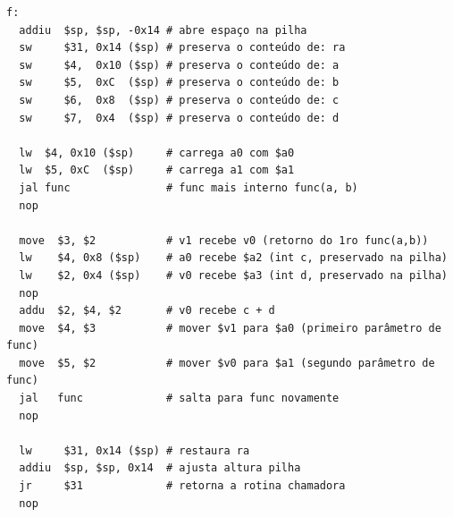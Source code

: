 \documentclass{article}
\begin{document}
\begin{verbatim}
f:
  addiu  $sp, $sp, -0x14 # abre espaço na pilha
  sw     $31, 0x14 ($sp) # preserva o conteúdo de: ra
  sw     $4,  0x10 ($sp) # preserva o conteúdo de: a
  sw     $5,  0xC  ($sp) # preserva o conteúdo de: b
  sw     $6,  0x8  ($sp) # preserva o conteúdo de: c
  sw     $7,  0x4  ($sp) # preserva o conteúdo de: d

  lw  $4, 0x10 ($sp)     # carrega a0 com $a0
  lw  $5, 0xC  ($sp)     # carrega a1 com $a1
  jal func               # func mais interno func(a, b)
  nop

  move  $3, $2           # v1 recebe v0 (retorno do 1ro func(a,b))
  lw    $4, 0x8 ($sp)    # a0 recebe $a2 (int c, preservado na pilha)
  lw    $2, 0x4 ($sp)    # v0 recebe $a3 (int d, preservado na pilha)
  nop
  addu  $2, $4, $2       # v0 recebe c + d
  move  $4, $3           # mover $v1 para $a0 (primeiro parâmetro de func)
  move  $5, $2           # mover $v0 para $a1 (segundo parâmetro de func)
  jal   func             # salta para func novamente
  nop

  lw     $31, 0x14 ($sp) # restaura ra
  addiu  $sp, $sp, 0x14  # ajusta altura pilha
  jr     $31             # retorna a rotina chamadora
  nop
\end{verbatim}
\end{document}
